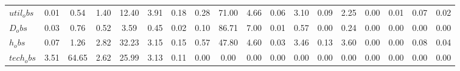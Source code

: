 \begin{center}
\begin{longtable}{lccccccccccccccccc}
$util_obs     $	 & 	            0.01	 & 	            0.54	 & 	            1.40	 & 	           12.40	 & 	            3.91	 & 	            0.18	 & 	            0.28	 & 	           71.00	 & 	            4.66	 & 	            0.06	 & 	            3.10	 & 	            0.09	 & 	            2.25	 & 	            0.00	 & 	            0.01	 & 	            0.07	 & 	            0.02 \\ 
$D_obs        $	 & 	            0.03	 & 	            0.76	 & 	            0.52	 & 	            3.59	 & 	            0.45	 & 	            0.02	 & 	            0.10	 & 	           86.71	 & 	            7.00	 & 	            0.01	 & 	            0.57	 & 	            0.00	 & 	            0.24	 & 	            0.00	 & 	            0.00	 & 	            0.00	 & 	            0.00 \\ 
$h_obs        $	 & 	            0.07	 & 	            1.26	 & 	            2.82	 & 	           32.23	 & 	            3.15	 & 	            0.15	 & 	            0.57	 & 	           47.80	 & 	            4.60	 & 	            0.03	 & 	            3.46	 & 	            0.13	 & 	            3.60	 & 	            0.00	 & 	            0.00	 & 	            0.08	 & 	            0.04 \\ 
$tech_obs     $	 & 	            3.51	 & 	           64.65	 & 	            2.62	 & 	           25.99	 & 	            3.13	 & 	            0.11	 & 	            0.00	 & 	            0.00	 & 	            0.00	 & 	            0.00	 & 	            0.00	 & 	            0.00	 & 	            0.00	 & 	            0.00	 & 	            0.00	 & 	            0.00	 & 	            0.00 \\ 
\end{longtable}
 \end{center}
